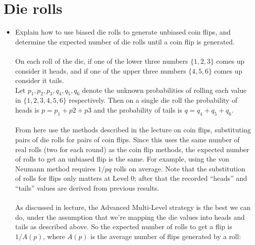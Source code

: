 \documentclass[11pt]{article}
\title{}
\author{}
\date{}                                           %
\begin{document}
\maketitle

\section{Die rolls}
\begin{itemize}
\item{
Explain how to use biased die rolls to generate unbiased coin flips, and determine the expected number of die rolls until a coin flip is generated.
\\
\\
On each roll of the die, if one of the lower three numbers $\{1,2,3\}$ comes up consider it heads, and if one of the upper three numbers $\{4,5,6\}$ comes up consider it tails.\\
Let $p_1, p_2, p_3, q_4, q_5, q_6$ denote the unknown probabilities of rolling each value in $\{1,2,3,4,5,6\}$ respectively. Then on a single die roll the probability of heads is $p = p_1 + p2 + p3$ and the probability of tails is $q = q_4 + q_5 + q_6$.
\\
\\
From here use the methods described in the lecture on coin flips, substituting pairs of die rolls for pairs of coin flips. Since this uses the same number of real rolls (two for each round) as the coin flip methods, the expected number of rolls to get an unbiased flip is the same. For example, using the von Neumann method requires $1/pq$ rolls on average. Note that the substitution of rolls for flips only matters at Level 0; after that the recorded ``heads'' and ``tails'' values are derived from previous results.
\\
\\
As discussed in lecture, the Advanced Multi-Level strategy is the best we can do, under the assumption that we're mapping the die values into heads and tails as described above. So the expected number of rolls to get a flip is $1/A(p)$, where $A(p)$ is the average number of flips generated by a roll:
\begin{equation*}

\end{equation*}}
\end{itemize}
\end{document}
